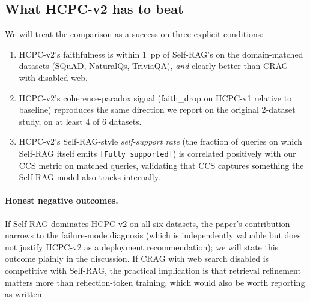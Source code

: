 \subsection{What HCPC-v2 has to beat}

We will treat the comparison as a success on three explicit conditions:

\begin{enumerate}
  \item HCPC-v2's faithfulness is within 1~pp of Self-RAG's on the
        domain-matched datasets (SQuAD, NaturalQs, TriviaQA), \emph{and}
        clearly better than CRAG-with-disabled-web.
  \item HCPC-v2's coherence-paradox signal (faith\_drop on HCPC-v1
        relative to baseline) reproduces the same direction we report on
        the original 2-dataset study, on at least 4 of 6 datasets.
  \item HCPC-v2's Self-RAG-style \emph{self-support rate} (the fraction
        of queries on which Self-RAG itself emits \texttt{[Fully
        supported]}) is correlated positively with our CCS metric on
        matched queries, validating that CCS captures something the
        Self-RAG model also tracks internally.
\end{enumerate}

\paragraph{Honest negative outcomes.} If Self-RAG dominates HCPC-v2 on
all six datasets, the paper's contribution narrows to the failure-mode
diagnosis (which is independently valuable but does not justify HCPC-v2
as a deployment recommendation); we will state this outcome plainly in
the discussion. If CRAG with web search disabled is competitive with
Self-RAG, the practical implication is that retrieval refinement matters
more than reflection-token training, which would also be worth reporting
as written.
